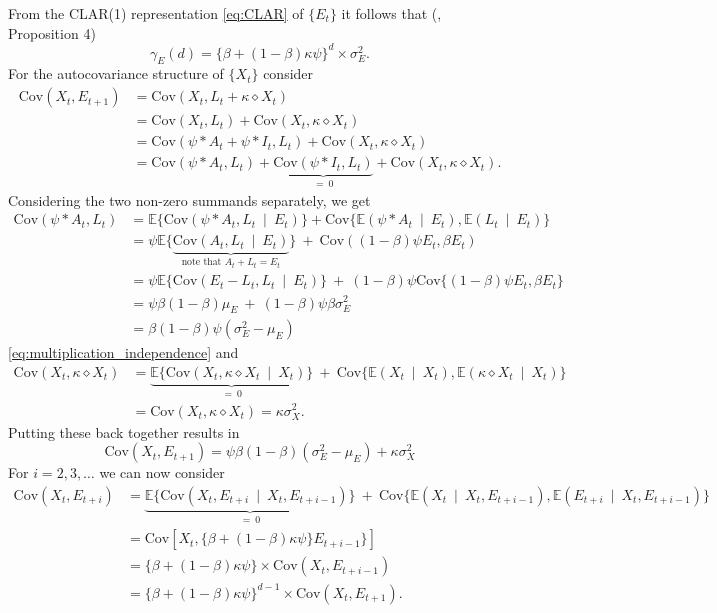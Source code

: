 \documentclass{article}
\begin{document}
From the CLAR(1) representation \eqref{eq:CLAR} of $\{E_t\}$ it follows that (\cite{Grunwald2000}, Proposition 4)
$$
\gamma_E(d) = \{\beta + (1 - \beta)\kappa\psi\}^d \times \sigma^2_E.
$$
For the autocovariance structure of $\{X_t\}$ consider
\begin{align*}
\text{Cov}(X_t, E_{t + 1}) & = \text{Cov}(X_t, L_t + \kappa \diamond X_t)\\
& = \text{Cov}(X_t, L_t) + \text{Cov}(X_t, \kappa \diamond X_t)\\
& = \text{Cov}(\psi * A_t + \psi * I_t, L_t) + \text{Cov}(X_t, \kappa \diamond X_t)\\
& = \text{Cov}(\psi * A_t, L_t) + \underbrace{\text{Cov}(\psi * I_t, L_t)}_{= \ 0} + \text{Cov}(X_t, \kappa \diamond X_t).
\end{align*}
Considering the two non-zero summands separately, we get
\begin{align*}
\text{Cov}(\psi * A_t, L_t) & = \mathbb{E}\{\text{Cov}(\psi * A_t, L_t \ \mid \ E_t)\} + \text{Cov}\{\mathbb{E}(\psi * A_t \ \mid \ E_t), \mathbb{E}(L_t \ \mid \ E_t)\}\\
& = \psi \mathbb{E}\{\underbrace{\text{Cov}(A_t, L_t \ \mid \ E_t)}_{\text{note that } A_t + L_t = E_t}\} \ + \ \text{Cov}((1 - \beta)\psi E_t, \beta E_t)\\
& = \psi \mathbb{E}\{\text{Cov}(E_t - L_t, L_t \ \mid \ E_t)\} \ + \ (1 - \beta)\psi \text{Cov}\{(1 - \beta)\psi E_t, \beta E_t\}\\
& = \psi \beta(1 - \beta)\mu_E \ + \ (1 - \beta)\psi\beta \sigma^2_E\\
& = \beta(1 - \beta)\psi(\sigma^2_E - \mu_E)
\end{align*}
\eqref{eq:multiplication_independence}
and
\begin{align*}
\text{Cov}(X_t, \kappa \diamond X_t) & = \underbrace{\mathbb{E}\{\text{Cov}(X_t, \kappa \diamond X_t \ \mid \ X_t)\}}_{= \ 0} \ + \ \text{Cov}\{\mathbb{E}(X_t \ \mid \ X_t), \mathbb{E}(\kappa \diamond X_t \ \mid \ X_t)\}\\
& = \text{Cov}(X_t, \kappa \diamond X_t) = \kappa\sigma^2_X.
\end{align*}
Putting these back together results in
$$
\text{Cov}(X_t, E_{t + 1}) = \psi\beta(1 - \beta)(\sigma^2_E - \mu_E) + \kappa\sigma^2_X
$$
For $i = 2, 3, \dots$ we can now consider
\begin{align*}
\text{Cov}(X_t, E_{t + i}) & = \underbrace{\mathbb{E}\{\text{Cov}(X_t, E_{t + i} \ \mid \ X_t, E_{t + i - 1})\}}_{= \ 0} \ + \ \text{Cov}\{\mathbb{E}(X_t \ \mid \ X_t, E_{t + i - 1}), \mathbb{E}(E_{t + i} \ \mid \ X_t, E_{t + i - 1})\}\\
& = \text{Cov}[X_t, \{\beta + (1 - \beta)\kappa\psi\} E_{t + i - 1}\}]\\
& = \{\beta + (1 - \beta)\kappa\psi\}\times\text{Cov}(X_t, E_{t + i - 1})\\
& = \{\beta + (1 - \beta)\kappa\psi\}^{d - 1}\times\text{Cov}(X_t, E_{t + 1}).
\end{align*}
\end{document}
